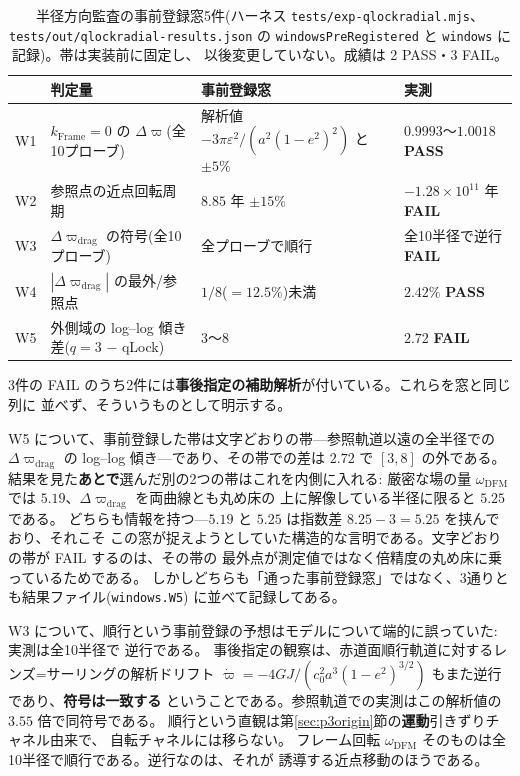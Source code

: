 \documentclass[a4paper,10pt,twocolumn]{ltjsarticle}
\begin{document}
\begin{table}[t]
\centering
\caption{半径方向監査の事前登録窓5件(ハーネス
  \texttt{tests/exp-qlockradial.mjs}、\texttt{tests/out/qlockradial-results.json} の
  \texttt{windowsPreRegistered} と \texttt{windows} に記録)。帯は実装前に固定し、
  以後変更していない。成績は 2 PASS・3 FAIL。}
\label{tab:w15}
{\small\setlength{\tabcolsep}{3pt}
\begin{tabularx}{\columnwidth}{@{}lYYY@{}}
\toprule
 & 判定量 & 事前登録窓 & 実測 \\
\midrule
W1 & $k_{\mathrm{Frame}}{=}0$ の $\Delta\varpi$(全10プローブ) &
  解析値 $-3\pi\varepsilon^{2}/(a^{2}(1-e^{2})^{2})$ と $\pm5\%$ &
  $0.9993$〜$1.0018$ \textbf{PASS} \\
W2 & 参照点の近点回転周期 & $8.85$ 年 $\pm15\%$ &
  $-1.28\times10^{11}$ 年 \textbf{FAIL} \\
W3 & $\Delta\varpi_{\mathrm{drag}}$ の符号(全10プローブ) &
  全プローブで順行 & 全10半径で逆行 \textbf{FAIL} \\
W4 & $|\Delta\varpi_{\mathrm{drag}}|$ の最外/参照点 &
  $1/8$($=12.5\%$)未満 & $2.42\%$ \textbf{PASS} \\
W5 & 外側域の log--log 傾き差($q{=}3$ − qLock) & $3$〜$8$ &
  $2.72$ \textbf{FAIL} \\
\bottomrule
\end{tabularx}}
\end{table}

3件の FAIL のうち2件には\textbf{事後指定の補助解析}が付いている。これらを窓と同じ列に
並べず、そういうものとして明示する。

W5 について、事前登録した帯は文字どおりの帯---参照軌道以遠の全半径での
$\Delta\varpi_{\mathrm{drag}}$ の log--log 傾き---であり、その帯での差は $2.72$ で
$[3,8]$ の外である。
結果を見た\textbf{あとで}選んだ別の2つの帯はこれを内側に入れる: 厳密な場の量
$\omega_{\mathrm{DFM}}$ では $5.19$、$\Delta\varpi_{\mathrm{drag}}$ を両曲線とも丸め床の
上に解像している半径に限ると $5.25$ である。
どちらも情報を持つ---$5.19$ と $5.25$ は指数差 $8.25-3=5.25$ を挟んでおり、それこそ
この窓が捉えようとしていた構造的な言明である。文字どおりの帯が FAIL するのは、その帯の
最外点が測定値ではなく倍精度の丸め床に乗っているためである。
しかしどちらも「通った事前登録窓」ではなく、3通りとも結果ファイル(\texttt{windows.W5})
に並べて記録してある。

W3 について、順行という事前登録の予想はモデルについて端的に誤っていた: 実測は全10半径で
逆行である。
事後指定の観察は、赤道面順行軌道に対するレンズ=サーリングの解析ドリフト
$\dot\varpi=-4GJ/(c_0^{2}a^{3}(1-e^{2})^{3/2})$ もまた逆行であり、\textbf{符号は一致する}
ということである。参照軌道での実測はこの解析値の $3.55$ 倍で同符号である。
順行という直観は第\ref{sec:p3origin}節の\textbf{運動}引きずりチャネル由来で、
自転チャネルには移らない。
フレーム回転 $\omega_{\mathrm{DFM}}$ そのものは全10半径で順行である。逆行なのは、それが
誘導する近点移動のほうである。
\end{document}
